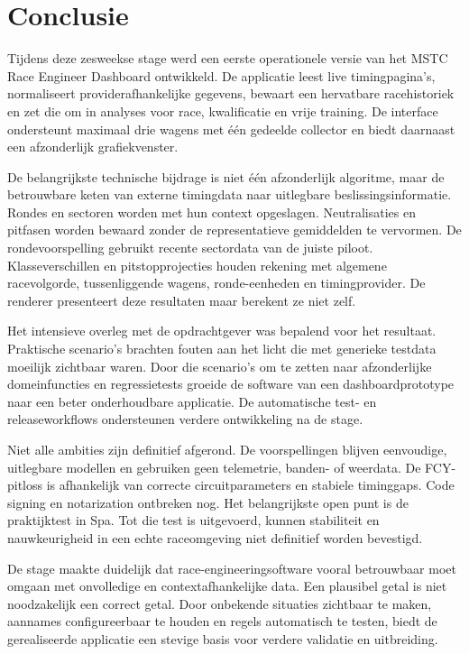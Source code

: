 \chapter{Conclusie}
\label{chap:conclusie}

Tijdens deze zesweekse stage werd een eerste operationele versie van het MSTC Race Engineer Dashboard ontwikkeld. De applicatie leest live timingpagina's, normaliseert providerafhankelijke gegevens, bewaart een hervatbare racehistoriek en zet die om in analyses voor race, kwalificatie en vrije training. De interface ondersteunt maximaal drie wagens met één gedeelde collector en biedt daarnaast een afzonderlijk grafiekvenster.

De belangrijkste technische bijdrage is niet één afzonderlijk algoritme, maar de betrouwbare keten van externe timingdata naar uitlegbare beslissingsinformatie. Rondes en sectoren worden met hun context opgeslagen. Neutralisaties en pitfasen worden bewaard zonder de representatieve gemiddelden te vervormen. De rondevoorspelling gebruikt recente sectordata van de juiste piloot. Klasseverschillen en pitstopprojecties houden rekening met algemene racevolgorde, tussenliggende wagens, ronde-eenheden en timingprovider. De renderer presenteert deze resultaten maar berekent ze niet zelf.

Het intensieve overleg met de opdrachtgever was bepalend voor het resultaat. Praktische scenario's brachten fouten aan het licht die met generieke testdata moeilijk zichtbaar waren. Door die scenario's om te zetten naar afzonderlijke domeinfuncties en regressietests groeide de software van een dashboardprototype naar een beter onderhoudbare applicatie. De automatische test- en releaseworkflows ondersteunen verdere ontwikkeling na de stage.

Niet alle ambities zijn definitief afgerond. De voorspellingen blijven eenvoudige, uitlegbare modellen en gebruiken geen telemetrie, banden- of weerdata. De FCY-pitloss is afhankelijk van correcte circuitparameters en stabiele timinggaps. Code signing en notarization ontbreken nog. Het belangrijkste open punt is de praktijktest in Spa. Tot die test is uitgevoerd, kunnen stabiliteit en nauwkeurigheid in een echte raceomgeving niet definitief worden bevestigd.

De stage maakte duidelijk dat race-engineeringsoftware vooral betrouwbaar moet omgaan met onvolledige en contextafhankelijke data. Een plausibel getal is niet noodzakelijk een correct getal. Door onbekende situaties zichtbaar te maken, aannames configureerbaar te houden en regels automatisch te testen, biedt de gerealiseerde applicatie een stevige basis voor verdere validatie en uitbreiding.

